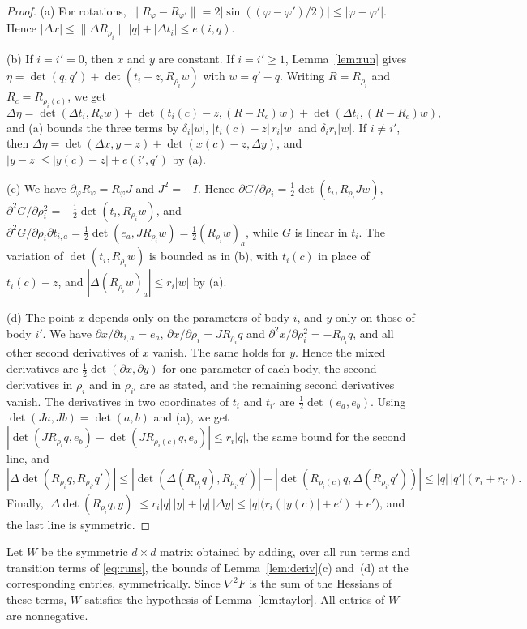 \documentclass[11pt]{amsart}
\theoremstyle{definition}
\theoremstyle{remark}
\numberwithin{equation}{section}
\begin{document}
\begin{proof}
(a) For rotations, $\|R_\varphi-R_{\varphi'}\|=2|\sin((\varphi-\varphi')/2)|\le|\varphi-\varphi'|$. Hence $|\Delta x|\le\|\Delta R_{\rho_i}\|\,|q|+|\Delta t_i|\le e(i,q)$.

(b) If $i=i'=0$, then $x$ and $y$ are constant. If $i=i'\ge1$, Lemma~\ref{lem:run} gives $\eta=\det(q,q')+\det(t_i-z,R_{\rho_i}w)$ with $w=q'-q$. Writing $R=R_{\rho_i}$ and $R_c=R_{\rho_i(c)}$, we get
\[
\Delta\eta=\det(\Delta t_i,R_cw)+\det(t_i(c)-z,(R-R_c)w)+\det(\Delta t_i,(R-R_c)w),
\]
and (a) bounds the three terms by $\delta_i|w|$, $|t_i(c)-z|\,r_i|w|$ and $\delta_ir_i|w|$. If $i\ne i'$, then $\Delta\eta=\det(\Delta x,y-z)+\det(x(c)-z,\Delta y)$, and $|y-z|\le|y(c)-z|+e(i',q')$ by (a).

(c) We have $\partial_\varphi R_\varphi=R_\varphi J$ and $J^2=-I$. Hence $\partial G/\partial\rho_i=\frac12\det(t_i,R_{\rho_i}Jw)$, $\partial^2G/\partial\rho_i^2=-\frac12\det(t_i,R_{\rho_i}w)$, and $\partial^2G/\partial\rho_i\partial t_{i,a}=\frac12\det(e_a,JR_{\rho_i}w)=\frac12(R_{\rho_i}w)_a$, while $G$ is linear in $t_i$. The variation of $\det(t_i,R_{\rho_i}w)$ is bounded as in (b), with $t_i(c)$ in place of $t_i(c)-z$, and $|\Delta(R_{\rho_i}w)_a|\le r_i|w|$ by (a).

(d) The point $x$ depends only on the parameters of body $i$, and $y$ only on those of body $i'$. We have $\partial x/\partial t_{i,a}=e_a$, $\partial x/\partial\rho_i=JR_{\rho_i}q$ and $\partial^2x/\partial\rho_i^2=-R_{\rho_i}q$, and all other second derivatives of $x$ vanish. The same holds for $y$. Hence the mixed derivatives are $\frac12\det(\partial x,\partial y)$ for one parameter of each body, the second derivatives in $\rho_i$ and in $\rho_{i'}$ are as stated, and the remaining second derivatives vanish. The derivatives in two coordinates of $t_i$ and $t_{i'}$ are $\frac12\det(e_a,e_b)$. Using $\det(Ja,Jb)=\det(a,b)$ and (a), we get $|\det(JR_{\rho_i}q,e_b)-\det(JR_{\rho_i(c)}q,e_b)|\le r_i|q|$, the same bound for the second line, and
\[
|\Delta\det(R_{\rho_i}q,R_{\rho_{i'}}q')|\le|\det(\Delta(R_{\rho_i}q),R_{\rho_{i'}}q')|+|\det(R_{\rho_i(c)}q,\Delta(R_{\rho_{i'}}q'))|\le|q|\,|q'|(r_i+r_{i'}).
\]
Finally, $|\Delta\det(R_{\rho_i}q,y)|\le r_i|q|\,|y|+|q|\,|\Delta y|\le|q|\bigl(r_i(|y(c)|+e')+e'\bigr)$, and the last line is symmetric.
\end{proof}

Let $W$ be the symmetric $d\times d$ matrix obtained by adding, over all run terms and transition terms of \eqref{eq:runs}, the bounds of Lemma~\ref{lem:deriv}(c) and~(d) at the corresponding entries, symmetrically. Since $\nabla^2F$ is the sum of the Hessians of these terms, $W$ satisfies the hypothesis of Lemma~\ref{lem:taylor}. All entries of $W$ are nonnegative.
\end{document}
